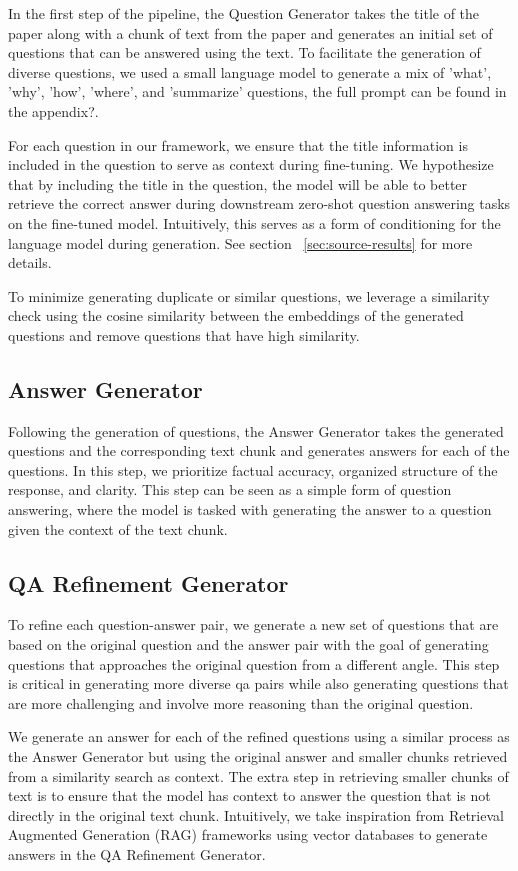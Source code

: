 In the first step of the pipeline, the Question Generator takes the title of the paper along with a chunk of text from the paper
and generates an initial set of questions that can be answered using the text. To facilitate the generation of diverse questions,
we used a small language model to generate a mix of 'what', 'why', 'how', 'where', and 'summarize' questions, the full prompt can be found in the appendix?.

For each question in our framework, we ensure that the title information is included in the question to serve as context during fine-tuning. We hypothesize
that by including the title in the question, the model will be able to better retrieve the correct answer during downstream zero-shot question answering tasks on the fine-tuned
model. Intuitively, this serves as a form of conditioning for the language model during generation. See section ~\ref{sec:source-results} for more details.

To minimize generating duplicate or similar questions, we leverage a similarity check using the cosine similarity between the embeddings of the generated questions
and remove questions that have high similarity.

\subsection{Answer Generator}

Following the generation of questions, the Answer Generator takes the generated questions and the corresponding text chunk and generates answers for each of the questions.
In this step, we prioritize factual accuracy, organized structure of the response, and clarity. This step can be seen as a simple form of question answering, where the model is
tasked with generating the answer to a question given the context of the text chunk.

\subsection{QA Refinement Generator}
To refine each question-answer pair, we generate a new set of questions that are based on the original question and the answer pair
with the goal of generating questions that approaches the original question from a different angle. This step is critical in
generating more diverse qa pairs while also generating questions that are more challenging and involve more reasoning than the original question.

We generate an answer for each of the refined questions using a similar process as the Answer Generator but using the original answer
and smaller chunks retrieved from a similarity search as context. The extra step in retrieving smaller chunks of text is to ensure that the model
has context to answer the question that is not directly in the original text chunk. Intuitively, we take inspiration from Retrieval Augmented Generation
(RAG) frameworks using vector databases to generate answers in the QA Refinement Generator.

